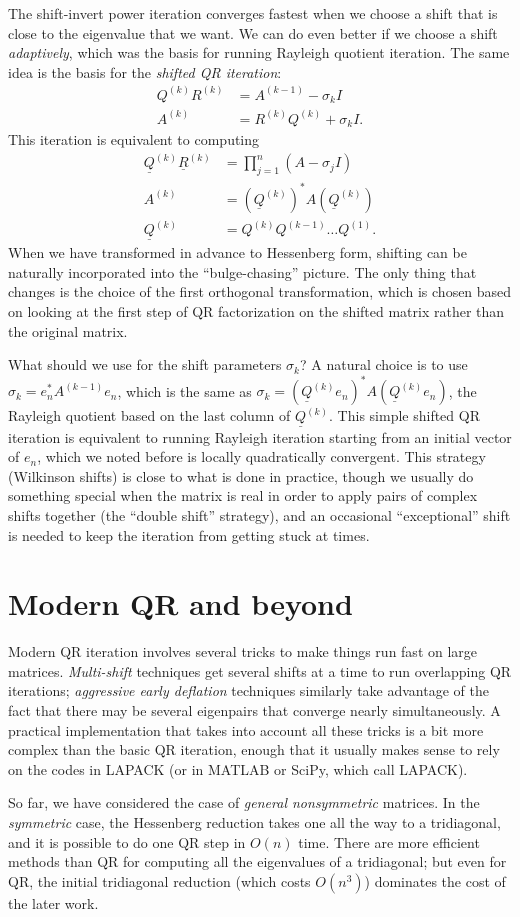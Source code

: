 \documentclass[12pt, leqno]{article} %
\newcommand{\uQ}{\underline{Q}}
\newcommand{\uR}{\underline{R}}
\begin{document}
The shift-invert power iteration converges fastest when we choose a
shift that is close to the eigenvalue that we want.  We can do even
better if we choose a shift {\em adaptively}, which was the basis for
running Rayleigh quotient iteration.  The same idea is the basis
for the {\em shifted QR iteration}:
\begin{align}
  Q^{(k)} R^{(k)} &= A^{(k-1)} - \sigma_k I \label{sqr-1} \\
  A^{(k)} &= R^{(k)} Q^{(k)} + \sigma_k I. \label{sqr-2}
\end{align}
This iteration is equivalent to computing
\begin{align*}
  \uQ^{(k)} \uR^{(k)} &= \prod_{j=1}^n (A-\sigma_j I) \\
  A^{(k)} &= (\uQ^{(k)})^* A (\uQ^{(k)}) \\
  \uQ^{(k)} &= Q^{(k)} Q^{(k-1)} \ldots Q^{(1)}.
\end{align*}
When we have transformed in advance to Hessenberg form, shifting can
be naturally incorporated into the ``bulge-chasing'' picture.  The
only thing that changes is the choice of the first orthogonal
transformation, which is chosen based on looking at the first step of
QR factorization on the shifted matrix rather than the original matrix.

What should we use for the shift parameters $\sigma_k$?  A natural
choice is to use $\sigma_k = e_n^* A^{(k-1)} e_n$, which is the same
as $\sigma_k = (\uQ^{(k)} e_n)^* A (\uQ^{(k)} e_n)$, the Rayleigh quotient
based on the last column of $\uQ^{(k)}$.  This simple shifted QR iteration
is equivalent to running Rayleigh iteration starting from an initial vector
of $e_n$, which we noted before is locally quadratically convergent.
This strategy (Wilkinson shifts) is close to what is done in practice,
though we usually do something special when the matrix is real in
order to apply pairs of complex shifts together (the ``double shift''
strategy), and an occasional ``exceptional'' shift is needed to keep
the iteration from getting stuck at times.

\section*{Modern QR and beyond}

Modern QR iteration involves several tricks to make things run fast on
large matrices.  {\em Multi-shift} techniques get several shifts at a
time to run overlapping QR iterations; {\em aggressive early
  deflation} techniques similarly take advantage of the fact that
there may be several eigenpairs that converge nearly simultaneously.
A practical implementation that takes into account all these tricks is
a bit more complex than the basic QR iteration, enough that it usually
makes sense to rely on the codes in LAPACK (or in MATLAB or SciPy,
which call LAPACK).

So far, we have considered the case of {\em general nonsymmetric}
matrices.  In the {\em symmetric} case, the Hessenberg reduction takes
one all the way to a tridiagonal, and it is possible to do one QR step
in $O(n)$ time.  There are more efficient methods than QR for
computing all the eigenvalues of a tridiagonal; but even for QR, the
initial tridiagonal reduction (which costs $O(n^3)$) dominates the
cost of the later work.
\end{document}
